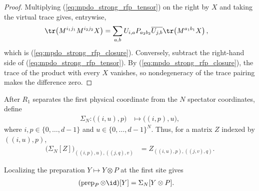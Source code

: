 \begin{proof}
    \leanok
    Multiplying (\ref{eq:mpdo_strong_rfp_tensor}) on the right by $X$ and
    taking the virtual trace gives, entrywise,
    \begin{align}
        \tr\!\left(M^{i_1j_1}M^{i_2j_2}X\right)
         & =\sum_{a,b}U_{i,a}P_{a_2b_2}\overline{U_{j,b}}
        \tr\!\left(M^{a_1b_1}X\right),
        \notag
    \end{align}
    which is (\ref{eq:mpdo_strong_rfp_closure}). Conversely, subtract the
    right-hand side of (\ref{eq:mpdo_strong_rfp_tensor}). By
    (\ref{eq:mpdo_strong_rfp_closure}), the trace of the product with every
    $X$ vanishes, so nondegeneracy of the trace pairing makes the difference
    zero.
\end{proof}

\begin{definition}
    \label{def:mpdo_first_site_preparation_shuffle}
    \leanok
    After $R_1$ separates the first physical coordinate from the $N$
    spectator coordinates, define
    \begin{align}
        \Sigma_N:\bigl((i,u),p\bigr) & \longmapsto\bigl((i,p),u\bigr),
        \label{eq:mpdo_first_site_preparation_shuffle}
    \end{align}
    where $i,p\in\{0,\ldots,d-1\}$ and
    $u\in\{0,\ldots,d-1\}^N$. Thus, for a matrix $Z$ indexed by
    $((i,u),p)$,
    \begin{align}
        \bigl(\Sigma_N[Z]\bigr)_{((i,p),u),((j,q),v)}
         & =Z_{((i,u),p),((j,v),q)}.
        \label{eq:mpdo_first_site_preparation_shuffle_matrix}
    \end{align}
\end{definition}

\begin{lemma}
    \label{lem:mpdo_localized_first_site_preparation}
    \leanok
    Localizing the preparation $Y\mapsto Y\otimes P$ at the first site gives
    \begin{align}
        (\operatorname{prep}_P\otimes\id)[Y]
         & =\Sigma_N[Y\otimes P].
        \label{eq:mpdo_localized_preparation_shuffle}
    \end{align}
\end{lemma}

